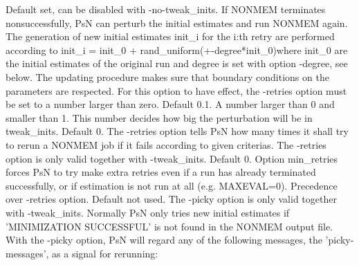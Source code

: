 \begin{optionlist}
Default set, can be disabled with -no-tweak\_inits. 
If NONMEM terminates nonsuccessfully, PsN can perturb the initial estimates and run NONMEM again. The generation of new initial estimates init\_i for the i:th retry are performed according to init\_i = init\_0 + rand\_uniform(+-degree*init\_0)where init\_0 are the initial estimates of the original run
and degree is set with option -degree, see below. 
The updating procedure makes sure that boundary conditions on the parameters are respected. 
For this option to have effect, the -retries option must be set to a number larger than zero. 
\nextopt
{}
Default 0.1. A number larger than 0 and smaller than 1. This number decides how big the perturbation will
be in tweak\_inits.
\nextopt
{}
Default 0. The -retries option tells PsN how many times it shall try to rerun a NONMEM job if it fails according to given criterias. 
The -retries option is only valid together with -tweak\_inits. 
\nextopt
{}
Default 0. Option min\_retries forces PsN to try make extra retries even if a run has already terminated successfully,
or if estimation is not run at all (e.g. MAXEVAL=0). Precedence over -retries option.  
\nextopt
{}
Default not used. The -picky option is only valid together with -tweak\_inits. Normally PsN only tries new initial estimates if 'MINIMIZATION SUCCESSFUL' is not found in the NONMEM output file. With the -picky option, PsN will regard any of the following messages, the 'picky-messages',  as a signal for rerunning:



\end{optionlist}

